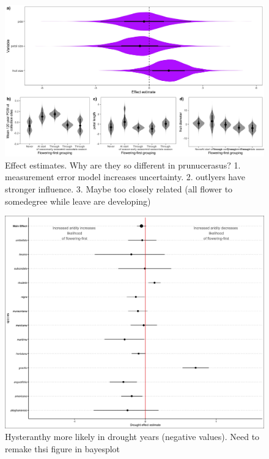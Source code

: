 \documentclass{article}\usepackage[]{graphicx}\usepackage[]{color}
\begin{document}
\begin{figure}[h!]
    \centering
 \includegraphics[width=\textwidth]{..//..//Plots/cerasus_mus.jpeg}
    \caption{Effect estimates. Why are they so different in prunucerasus? 1. measurement error model increases uncertainty. 2. outlyers have stronger influence. 3. Maybe too closely related (all flower to somedegree while leave are developing) }
    \label{fig:prunes}
\end{figure}


\begin{figure}[h!]
    \centering
 \includegraphics[width=\textwidth]{..//..//Plots/droughtstuff.jpg}
    \caption{Hysteranthy more likely in drought years (negative values). Need to remake thsi figure in bayesplot}
    \label{fig:plastic}
\end{figure}
\end{document}
